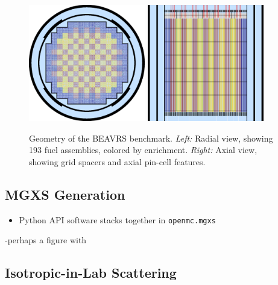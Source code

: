 \begin{figure}[htb!]
    \centering
    \includegraphics[width=2in]{figures/workflow/openmc/core}\hspace{1cm}
    \includegraphics[width=2in]{figures/workflow/openmc/core_axial}
    \caption{\label{fig:beavrs} Geometry of the BEAVRS benchmark. \emph{Left:} Radial view, showing 193 fuel assemblies, colored by enrichment. \emph{Right:} Axial view, showing grid spacers and axial pin-cell features.}
\end{figure}

\subsection{MGXS Generation}
\label{sec:chap3-mgxs}

\begin{itemize}[noitemsep]
  \item Python \ac{API} software stacks together in \texttt{openmc.mgxs}
\end{itemize}

-perhaps a figure with 

\subsection{Isotropic-in-Lab Scattering}
\label{sec:chap3-iso-in-lab}


